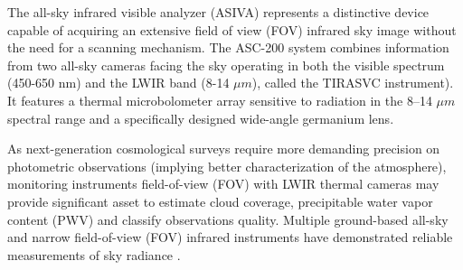 \documentclass{article}
\begin{document}
The all-sky infrared visible analyzer (ASIVA) \citep{Klebe2014} represents a distinctive device capable of acquiring an extensive field of view (FOV) infrared sky image without the need for a scanning mechanism. The ASC-200 system \citep{rs13091852} combines information from two all-sky cameras facing the sky operating in both the visible spectrum (450-650 nm) and the LWIR band (8-14 $\mu m$), called the TIRASVC instrument). It features a thermal microbolometer array sensitive to radiation in the 8–14 $\mu m$ spectral range and a specifically designed wide-angle germanium lens.

As next-generation cosmological surveys require more demanding precision on photometric observations (implying better characterization of the atmosphere), monitoring instruments field-of-view (FOV) with LWIR thermal cameras may provide significant asset to estimate cloud coverage, precipitable water vapor content (PWV) and classify observations quality. Multiple ground-based all-sky and narrow field-of-view (FOV) infrared instruments have demonstrated reliable measurements of sky radiance \citep{Klebe2012, Klebe2014}.
\end{document}
